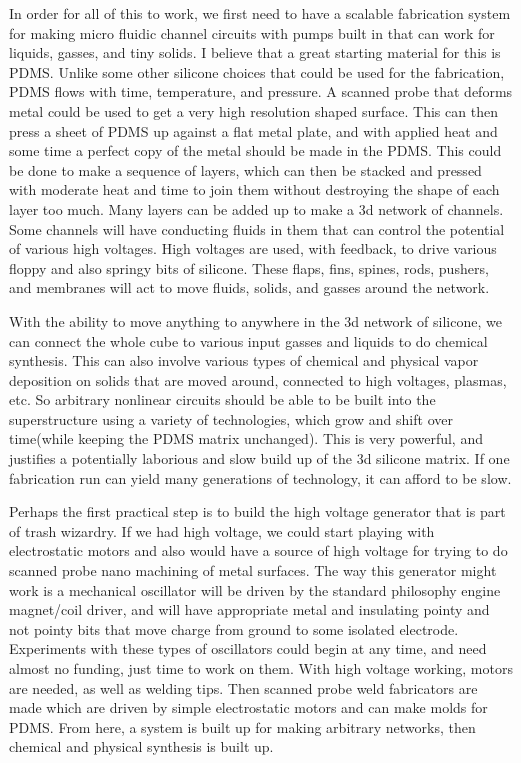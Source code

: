 In order for all of this to work, we first need to have a scalable
fabrication system for making micro fluidic channel circuits with pumps
built in that can work for liquids, gasses, and tiny solids. I believe
that a great starting material for this is PDMS. Unlike some other
silicone choices that could be used for the fabrication, PDMS flows with
time, temperature, and pressure. A scanned probe that deforms metal
could be used to get a very high resolution shaped surface. This can
then press a sheet of PDMS up against a flat metal plate, and with
applied heat and some time a perfect copy of the metal should be made in
the PDMS. This could be done to make a sequence of layers, which can
then be stacked and pressed with moderate heat and time to join them
without destroying the shape of each layer too much. Many layers can be
added up to make a 3d network of channels. Some channels will have
conducting fluids in them that can control the potential of various high
voltages. High voltages are used, with feedback, to drive various floppy
and also springy bits of silicone. These flaps, fins, spines, rods,
pushers, and membranes will act to move fluids, solids, and gasses
around the network.

With the ability to move anything to anywhere in the 3d network of
silicone, we can connect the whole cube to various input gasses and
liquids to do chemical synthesis. This can also involve various types of
chemical and physical vapor deposition on solids that are moved around,
connected to high voltages, plasmas, etc. So arbitrary nonlinear
circuits should be able to be built into the superstructure using a
variety of technologies, which grow and shift over time(while keeping
the PDMS matrix unchanged). This is very powerful, and justifies a
potentially laborious and slow build up of the 3d silicone matrix. If
one fabrication run can yield many generations of technology, it can
afford to be slow.

Perhaps the first practical step is to build the high voltage generator
that is part of trash wizardry. If we had high voltage, we could start
playing with electrostatic motors and also would have a source of high
voltage for trying to do scanned probe nano machining of metal surfaces.
The way this generator might work is a mechanical oscillator will be
driven by the standard philosophy engine magnet/coil driver, and will
have appropriate metal and insulating pointy and not pointy bits that
move charge from ground to some isolated electrode. Experiments with
these types of oscillators could begin at any time, and need almost no
funding, just time to work on them. With high voltage working, motors
are needed, as well as welding tips. Then scanned probe weld fabricators
are made which are driven by simple electrostatic motors and can make
molds for PDMS. From here, a system is built up for making arbitrary
networks, then chemical and physical synthesis is built up.

